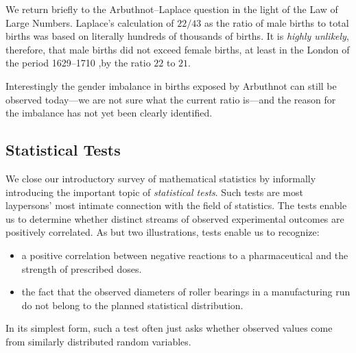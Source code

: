 \medskip

We return briefly to the Arbuthnot--Laplace question in the light of the Law of Large Numbers.  Laplace's calculation of $22/43$ as the ratio of male births to total births was based on literally hundreds of thousands of births.  It is {\em highly unlikely}, therefore, that male births did not exceed female births, at least in the London of the period 1629--1710 ,by the ratio $22$ to $21$.

\medskip

\noindent
Interestingly the gender imbalance in births exposed by Arbuthnot can still be observed today---we are not sure what the current ratio is---and the reason for the imbalance has not yet been clearly identified.

\subsection{Statistical Tests}
\label{sec:stat-tests}


We close our introductory survey of mathematical statistics by informally introducing the important topic of {\em statistical tests}.  Such tests are most laypersons' most intimate connection with the field of statistics.  The tests enable us to determine whether distinct streams of observed experimental outcomes are positively correlated.  As but two illustrations, tests enable us to recognize:
\begin{itemize}
\item
a positive correlation between negative reactions to a pharmaceutical and the strength of prescribed doses.  
\medskip\item
the fact that the observed diameters of roller bearings in a manufacturing run do not belong to the planned statistical distribution.
\end{itemize}
In its simplest form, such a test often just asks whether observed values come from similarly distributed random variables.

\medskip

